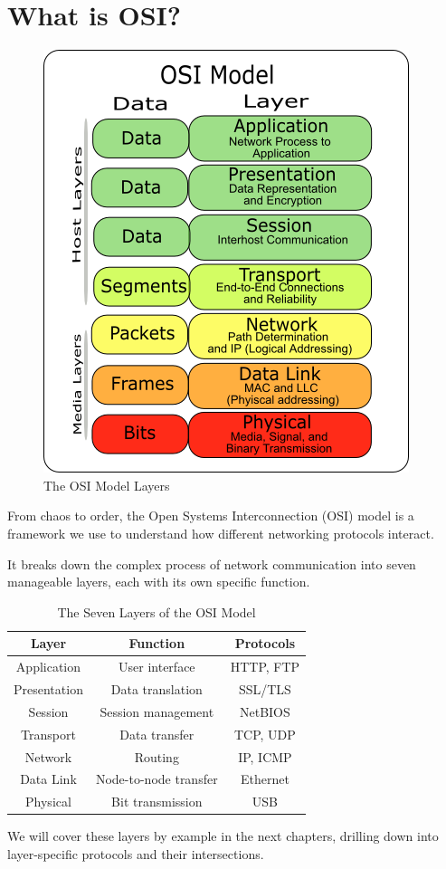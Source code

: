 
\section{What is OSI?}
\begin{figure}[h]
    \centering
    \includegraphics[width=.3\textwidth]{assets/osi/layers.png}
    \caption{The OSI Model Layers}\label{fig:osi_layers_intro}
\end{figure}
From chaos to order, the Open Systems Interconnection (OSI) model is a framework we use to understand how different networking protocols interact. 

It breaks down the complex process of network communication into seven manageable layers, each with its own specific function.

\begin{table}[h]
    \centering
    \begin{tabular}{|c|c|c|}
        \hline
        \textbf{Layer} & \textbf{Function} & \textbf{Protocols} \\
        \hline
        Application & User interface & HTTP, FTP \\
        Presentation & Data translation & SSL/TLS \\
        Session & Session management & NetBIOS \\
        Transport & Data transfer & TCP, UDP \\
        Network & Routing & IP, ICMP \\
        Data Link & Node-to-node transfer & Ethernet \\
        Physical & Bit transmission & USB \\
        \hline
        \end{tabular}
    \caption{The Seven Layers of the OSI Model}\label{tab:osi_layers}
\end{table}

We will cover these layers by example in the next chapters, drilling down into layer-specific protocols and their intersections.
